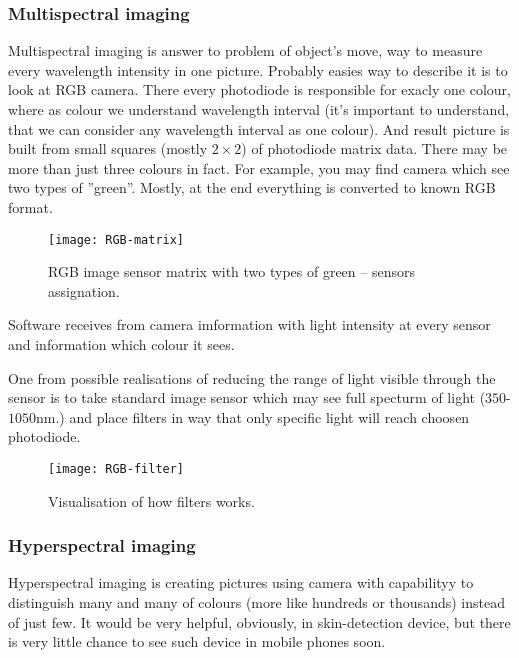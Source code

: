         \subsubsection*{Multispectral imaging}
            Multispectral imaging is answer to
            problem of object's move,
            way to measure every wavelength intensity in one picture.
            Probably easies way to describe it is to look at RGB camera.
            There every photodiode is responsible for exacly one colour,
            where as colour we understand wavelength interval (it's important
            to understand, that we can consider any wavelength interval as one colour).
            And result picture is built from small squares (mostly $2 \times 2$)
            of photodiode matrix data.
            There may be more than just  three colours in fact.
            For example, you may find camera which see two types of ''green''.
            Mostly, at the end everything is converted to known RGB format.

            \begin{figure}[H]
                \caption{RGB image sensor matrix with two types of green -- sensors assignation.}
                \centering
                \texttt{[image: RGB-matrix]}
                \label{fig:RGB-matrix}
            \end{figure}

            Software receives from camera imformation with light intensity at every
            sensor and information which colour it sees.

            One from possible realisations of reducing the range
            of light visible through the sensor is to take standard image sensor which
            may see full specturm of light ($350$-$1050$nm.) and
            place filters in way that only specific light will reach choosen photodiode.

            \begin{figure}[H]
                \caption{Visualisation of how filters works.}
                \centering
                \texttt{[image: RGB-filter]}
                \label{fig:RGB-filter}
            \end{figure}

        \subsubsection*{Hyperspectral imaging}
            Hyperspectral imaging is creating pictures using camera with
            capabilityy to distinguish many and many of colours (more like hundreds or thousands)
            instead of just few.
            It would be very helpful, obviously, in skin-detection device,
            but there is very little chance to see such device in mobile phones soon.

